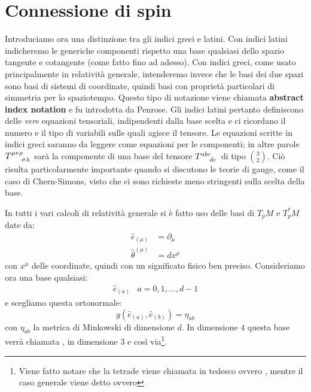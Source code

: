 \section{Connessione di spin}\label{para.veilbein}
Introduciamo ora una distinzione tra gli indici greci e latini. Con indici latini indicheremo le generiche componenti rispetto una base qualsiasi dello spazio tangente e cotangente (come fatto fino ad adesso). Con indici greci, come usato principalmente in relatività generale, intenderemo invece che le basi dei due spazi sono basi di sistemi di coordinate, quindi basi con proprietà particolari di simmetria per lo spaziotempo. Questo tipo di notazione viene chiamata \textbf{abstract index notation} e fu introdotta da Penrose. 
Gli indici latini pertanto definiscono delle \textit{vere} equazioni tensoriali, indipendenti dalla base scelta e ci ricordano il numero e il tipo di variabili sulle quali agisce il tensore. Le equazioni scritte in indici greci saranno da leggere come equazioni per le componenti; in altre parole $\tensor{T}{^{\mu\nu\rho}_{\sigma\lambda}}$ sarà la componente di una base del tensore  $\tensor{T}{^{abc}_{de}}$ di tipo $\binom{3}{2}$. 
Ciò risulta particolarmente importante quando si discutono le teorie di gauge, come il caso di Chern-Simons, visto che ci sono richieste meno stringenti sulla scelta della base.

In tutti i vari calcoli di relatività generale si è fatto uso delle basi di $T_p M$ e $T_p^*M$ date da:
\begin{align*}
    \hat{e}_{(\mu)} &= \partial_\mu  \\
    \hat{\theta}^{(\mu)} &= dx^\mu
\end{align*}
con $x^\mu$ delle coordinate, quindi con un significato fisico ben preciso. Consideriamo ora una base qualsiasi:
\begin{equation*}
\begin{array}{cc}
     \hat{e}_{(a)} & a = 0, 1, \dots, d-1
\end{array}
\end{equation*}
e scegliamo questa ortonormale:
\begin{equation*}
    g(\hat{e}_{(a)}, \hat{e}_{(b)} ) = \eta_{ab}
\end{equation*}
con $\eta_{ab}$ la metrica di Minkowski di dimensione $d$. In dimensione $4$ questa base verrà chiamata , in dimensione 3  e così via\footnote{Viene fatto notare che la tetrade viene chiamata in tedesco  ovvero , mentre il caso generale viene detto  ovvero }.


